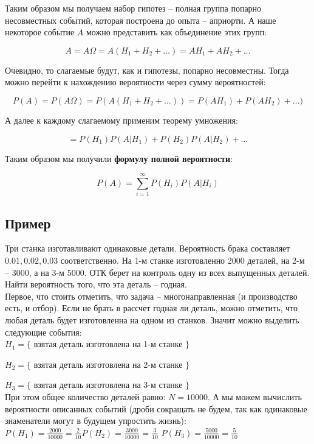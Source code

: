 \documentclass{article}
\begin{document}
Таким образом мы получаем набор гипотез -- полная группа попарно несовместных событий, которая построена до опыта -- априорти. А наше некоторое событие $A$ можно представить как объединение этих групп:

$$ A = A  \Omega = A (H_1 + H_2 + \ldots) = AH_1 + AH_2 + \ldots$$

Очевидно, то слагаемые будут, как и гипотезы, попарно несовместны. Тогда можно перейти к нахождению вероятности через сумму вероятностей:

$$ P(A) = P(A\Omega) = P(A(H_1 + H_2 + \ldots)) = P(AH_1) + P(AH_2) + \ldots) $$

А далее к каждому слагаемому применим теорему умножения:

$$ = P(H_1)P(A|H_1) + P(H_2)P(A|H_2) + \ldots $$

Таким образом мы получили \textbf{формулу полной вероятности}:

$$ P(A) = \sum\limits_{i = 1}^\infty P(H_i)P(A|H_i) $$

\subsection{Пример}

Три станка изготавливают одинаковые детали. Вероятность брака составляет $0.01, 0.02, 0.03$ соответственно. На 1-м станке изготовленно 2000 деталей, на 2-м -- 3000, а на 3-м 5000. ОТК берет на контроль одну из всех выпущенных деталей. Найти вероятность того, что эта деталь -- годная.
\\

Первое, что стоить отметить, что задача -- многонаправленная (и производство есть, и отбор). Если не брать в рассчет годная ли деталь, можно отметить, что любая деталь будет изготовленна на одном из станков. Значит можно выделить следующие события:
\\

$H_1 = \{$ взятая деталь изготовлена на 1-м станке $\}$

$H_2 = \{$ взятая деталь изготовлена на 2-м станке $\}$

$H_3 = \{$ взятая деталь изготовлена на 3-м станке $\}$
\\

При этом общее количество деталей равно: $N = 10000$. А мы можем вычислить вероятности описанных событий (дроби сокращать не будем, так как одинаковые знаменатели могут в будущем упростить жизнь):
\\

$P(H_1) = \frac{2000}{10000} = \frac{2}{10}$\qquad$P(H_2) = \frac{3000}{10000} = \frac{3}{10}$
\qquad$P(H_3) = \frac{5000}{10000} = \frac{5}{10}$
\\
\end{document}
